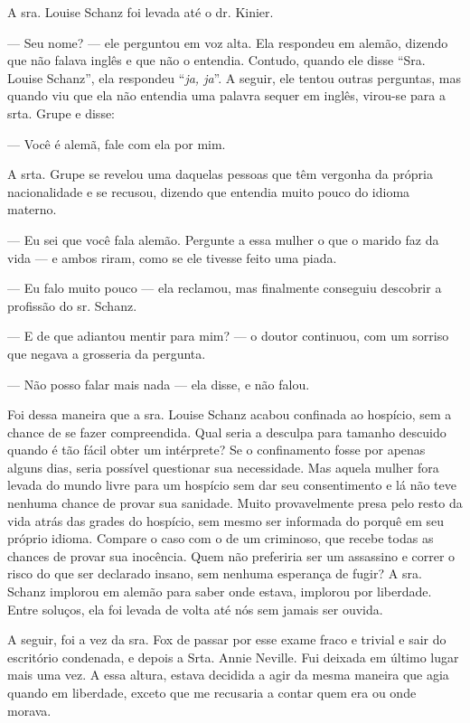 A sra. Louise Schanz foi levada até o dr. Kinier.

--- Seu nome? --- ele perguntou em voz alta. Ela respondeu em alemão,
dizendo que não falava inglês e que não o entendia. Contudo, quando ele
disse ``Sra. Louise Schanz'', ela respondeu ``\emph{ja, ja}''. A seguir, ele
tentou outras perguntas, mas quando viu que ela não entendia uma palavra
sequer em inglês, virou-se para a srta. Grupe e disse:

--- Você é alemã, fale com ela por mim.

A srta. Grupe se revelou uma daquelas pessoas que têm vergonha da
própria nacionalidade e se recusou, dizendo que entendia muito pouco do
idioma materno.

--- Eu sei que você fala alemão. Pergunte a essa mulher o que o marido
faz da vida --- e ambos riram, como se ele tivesse feito uma piada.

--- Eu falo muito pouco --- ela reclamou, mas finalmente conseguiu
descobrir a profissão do sr. Schanz.

--- E de que adiantou mentir para mim? --- o doutor continuou, com um
sorriso que negava a grosseria da pergunta.

--- Não posso falar mais nada --- ela disse, e não falou.

Foi dessa maneira que a sra. Louise Schanz acabou confinada ao hospício,
sem a chance de se fazer compreendida. Qual seria a desculpa para
tamanho descuido quando é tão fácil obter um intérprete? Se o
confinamento fosse por apenas alguns dias, seria possível questionar sua
necessidade. Mas aquela mulher fora levada do mundo livre para um
hospício sem dar seu consentimento e lá não teve nenhuma chance de
provar sua sanidade. Muito provavelmente presa pelo resto da vida atrás
das grades do hospício, sem mesmo ser informada do porquê em seu próprio
idioma. Compare o caso com o de um criminoso, que recebe todas as
chances de provar sua inocência. Quem não preferiria ser um assassino e
correr o risco do que ser declarado insano, sem nenhuma esperança de
fugir? A sra. Schanz implorou em alemão para saber onde estava, implorou
por liberdade. Entre soluços, ela foi levada de volta até nós sem jamais
ser ouvida.


A seguir, foi a vez da sra. Fox de passar por esse exame fraco e trivial e
sair do escritório condenada, e depois a Srta. Annie Neville. Fui deixada
em último lugar mais uma vez. A essa altura, estava decidida a agir da
mesma maneira que agia quando em liberdade, exceto que me recusaria a contar
quem era ou onde morava.


